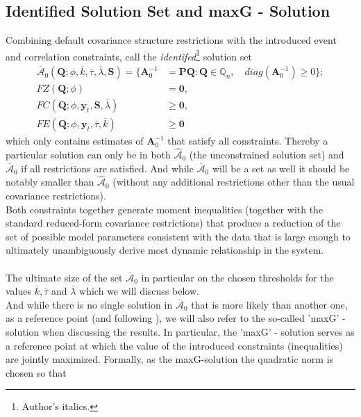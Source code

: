 \documentclass[a4paper,11pt,listof=nochaptergap,oneside,pointednumbers,bibtotoc,bigheadings,liststotoc]{scrbook}
\theoremstyle{mysatz}
\theoremstyle{mydefinition}
\theoremstyle{mybemerkung}
\let\oldhat\hat
\newcommand{\vect}[1]{\boldsymbol{\mathbf{#1}}}
\newcommand{\hatt}[1]{\oldhat{\boldsymbol{\mathbf{#1}}}}
\begin{document}
\subsection{Identified Solution Set and maxG - Solution}
Combining default covariance structure restrictions with the introduced event and correlation constraints, \citet{ludvigsonetal:18} call the \textit{identifed}\footnote{Author's italics.} solution set 
\begin{equation} \label{eq:svar_ludvi14}
\begin{split}
\overline{\vect{\mathcal{A}}}_0(\vect{Q}; \phi, \overline{k}, \overline{\tau}, \overline{\lambda}, \vect{S})  = \{\vect{A}_0^{-1} & = \vect{P}\vect{Q}: \vect{Q} \in \mathbb{Q}_n, \quad diag(\vect{A}_0^{-1}) \geq 0\}; \\
			FZ(\vect{Q}; \phi) & = \vect{0}, \\
			FC(\vect{Q}; \phi, \vect{y}_t, \vect{S}, \overline{\lambda}) & \geq \vect{0}, \\
			FE(\vect{Q}; \phi, \vect{y}_t, \overline{\tau}, \overline{k}) & \geq \vect{0}
\end{split}								
\end{equation}
which only contains estimates of $\vect{A}_0^{-1}$ that satisfy all constraints. Thereby a particular solution can only be in both $\hatt{\mathcal{A}}_0$ (the unconstrained solution set) and $\overline{\vect{\mathcal{A}}}_0$ if all restrictions are satisfied. And while $\overline{\vect{\mathcal{A}}}_0$ will be a set as well it should be notably smaller than $\hatt{\mathcal{A}}_0$ (without any additional restrictions other than the usual covariance restrictions).
\\
Both constraints together generate moment inequalities (together with the standard reduced-form covariance restrictions) that produce a reduction of the set of possible model parameters consistent with the data that is large enough to ultimately unambiguously derive most dynamic relationship in the system.\\
\\
The ultimate size of the set $\overline{\vect{\mathcal{A}}}_0$ in particular on the chosen thresholds for the values $\overline{k}, \overline{\tau}$ and $\overline{\lambda}$ which we will discuss below.\\
And while there is no single solution in $\overline{\vect{\mathcal{A}}}_0$ that is more likely than another one, as a reference point (and following \citet{ludvigsonetal:18}), we will also refer to the so-called 'maxG' - solution when discussing the results. In particular, the 'maxG' - solution serves as a reference point at which the value of the introduced constraints (inequalities) are jointly maximized. Formally, as the maxG-solution the quadratic norm is chosen so that
\end{document}
